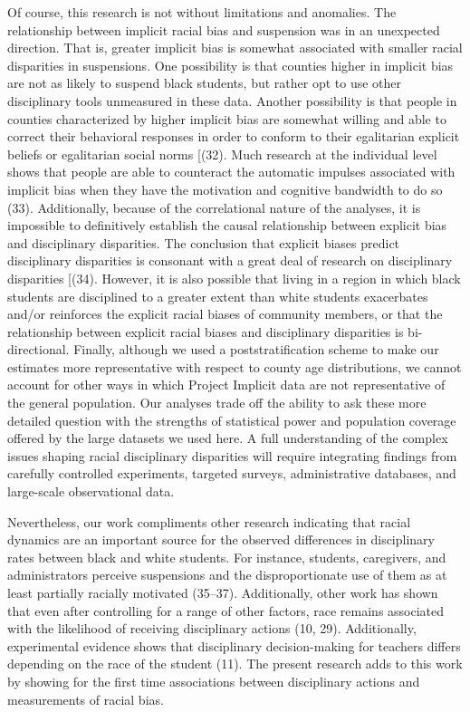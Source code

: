 \documentclass[9pt,twocolumn,twoside,lineno]{pnas-new}
\begin{document}
Of course, this research is not without limitations and anomalies. The
relationship between implicit racial bias and suspension was in an
unexpected direction. That is, greater implicit bias is somewhat
associated with smaller racial disparities in suspensions. One
possibility is that counties higher in implicit bias are not as likely
to suspend black students, but rather opt to use other disciplinary
tools unmeasured in these data. Another possibility is that people in
counties characterized by higher implicit bias are somewhat willing and
able to correct their behavioral responses in order to conform to their
egalitarian explicit beliefs or egalitarian social norms {[}(32). Much
research at the individual level shows that people are able to
counteract the automatic impulses associated with implicit bias when
they have the motivation and cognitive bandwidth to do so (33).
Additionally, because of the correlational nature of the analyses, it is
impossible to definitively establish the causal relationship between
explicit bias and disciplinary disparities. The conclusion that explicit
biases predict disciplinary disparities is consonant with a great deal
of research on disciplinary disparities {[}(34). However, it is also
possible that living in a region in which black students are disciplined
to a greater extent than white students exacerbates and/or reinforces
the explicit racial biases of community members, or that the
relationship between explicit racial biases and disciplinary disparities
is bi-directional. Finally, although we used a poststratification scheme
to make our estimates more representative with respect to county age
distributions, we cannot account for other ways in which Project
Implicit data are not representative of the general population. Our
analyses trade off the ability to ask these more detailed question with
the strengths of statistical power and population coverage offered by
the large datasets we used here. A full understanding of the complex
issues shaping racial disciplinary disparities will require integrating
findings from carefully controlled experiments, targeted surveys,
administrative databases, and large-scale observational data.

Nevertheless, our work compliments other research indicating that racial
dynamics are an important source for the observed differences in
disciplinary rates between black and white students. For instance,
students, caregivers, and administrators perceive suspensions and the
disproportionate use of them as at least partially racially motivated
(35--37). Additionally, other work has shown that even after controlling
for a range of other factors, race remains associated with the
likelihood of receiving disciplinary actions (10, 29). Additionally,
experimental evidence shows that disciplinary decision-making for
teachers differs depending on the race of the student (11). The present
research adds to this work by showing for the first time associations
between disciplinary actions and measurements of racial bias.
\end{document}
